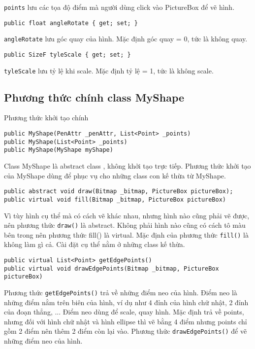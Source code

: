 \documentclass[12pt]{article}
\begin{document}
\texttt{points} lưu các tọa độ điểm mà người dùng click vào PictureBox để vẽ hình.

\begin{lstlisting}
public float angleRotate { get; set; }
\end{lstlisting}

\texttt{angleRotate} lưu góc quay của hình. Mặc định góc quay = 0, tức là không quay.

\begin{lstlisting}
public SizeF tyleScale { get; set; }
\end{lstlisting}

\texttt{tyleScale} lưu tỷ lệ khi scale. Mặc định tỷ lệ = 1, tức là không scale.

\subsection{Phương thức chính class MyShape}
Phương thức khởi tạo chính
\begin{lstlisting}
public MyShape(PenAttr _penAttr, List<Point> _points)
public MyShape(List<Point> _points)
public MyShape(MyShape myShape)
\end{lstlisting}

Class MyShape là abstract class , không khởi tạo trực tiếp.
Phương thức khởi tạo của MyShape dùng để phục vụ cho những class con kế thừa từ MyShape.

\begin{lstlisting}
public abstract void draw(Bitmap _bitmap, PictureBox pictureBox);
public virtual void fill(Bitmap _bitmap, PictureBox pictureBox)
\end{lstlisting}

Vì tùy hình cụ thể mà có cách vẽ khác nhau, nhưng hình nào cũng phải vẽ được,
nên phương thức \texttt{draw()} là abstract.
Không phải hình nào cũng có cách tô màu bên trong nên phương thức fill() là virtual.
Mặc định của phương thức \texttt{fill()} là không làm gì cả.
Cài đặt cụ thể nằm ở những class kế thừa.

\begin{lstlisting}
public virtual List<Point> getEdgePoints()
public virtual void drawEdgePoints(Bitmap _bitmap, PictureBox pictureBox)
\end{lstlisting}

Phương thức \texttt{getEdgePoints()} trả về những điểm neo của hình.
Điểm neo là những điểm nằm trên biên của hình, ví dụ như 4 đỉnh của hình chữ nhật,
2 đỉnh của đoạn thẳng, ...
Điểm neo dùng để scale, quay hình.
Mặc định trả về points, nhưng đối với hình chữ nhật và hình ellipse thì
vẽ bằng 4 điểm nhưng points chỉ gồm 2 điểm nên thêm 2 điểm còn lại vào.
Phương thức \texttt{drawEdgePoints()} để vẽ những điểm neo của hình.
\end{document}
